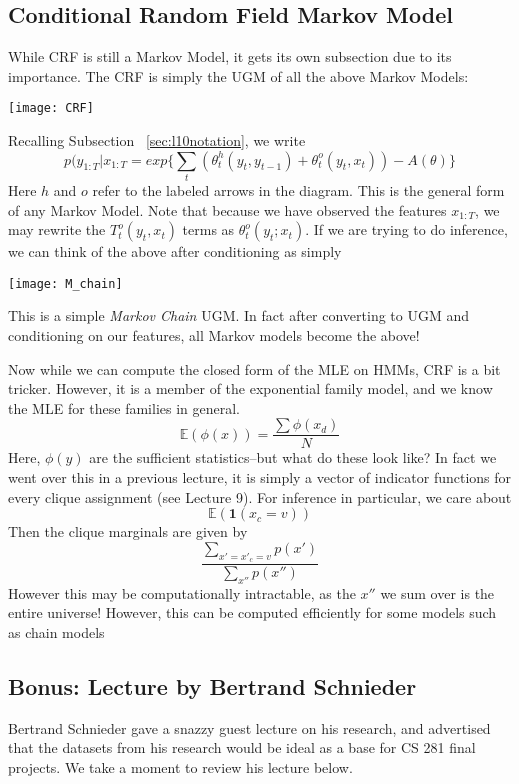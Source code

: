 \documentclass{article}
\begin{document}
\subsection{Conditional Random Field Markov Model}
While CRF is still a Markov Model, it gets its own subsection due to its importance. The CRF is simply the UGM of all the above Markov Models:
\begin{center}
\texttt{[image: CRF]} 
\end{center}
Recalling Subsection ~\ref{sec:l10notation}, we write
\[
p(y_{1:T}|x_{1:T} = exp\{\sum\limits_{t}(\theta_t^h(y_t,y_{t-1})+\theta_t^o(y_t,x_t)) - A(\theta) \}
\]
Here $h$ and $o$ refer to the labeled arrows in the diagram.
This is the general form of any Markov Model. Note that because we have observed the features $x_{1:T}$, we may rewrite the $T_t^o(y_t,x_t)$ terms as $\theta_t^o(y_t;x_t)$. If we are trying to do inference, we can think of the above after conditioning as simply
\begin{center}
\texttt{[image: M\_chain]} 
\end{center}
This is a simple \textit{Markov Chain} UGM. In fact after converting to UGM and conditioning on our features, all Markov models become the above! 

Now while we can compute the closed form of the MLE on HMMs, CRF is a bit tricker. However, it is a member of the exponential family model, and we know the MLE for these families in general.
\[
\mathbb{E}(\phi(x)) = \frac{\sum \phi(x_d)}{N}
\]
Here, $\phi(y)$ are the sufficient statistics--but what do these look like? In fact we went over this in a previous lecture, it is simply a vector of indicator functions for every clique assignment (see Lecture 9). For inference in particular, we care about
\[
\mathbb{E}(\textbf{1}(x_c=v))
\]
Then the clique marginals are given by
\[
\frac{\sum\limits_{x'=x'_c=v} p(x')}{\sum\limits_{x''}p(x'')}
\]
However this may be computationally intractable, as the $x''$ we sum over is the entire universe! However, this can be computed efficiently for some models such as chain models

\subsection{Bonus: Lecture by Bertrand Schnieder}

Bertrand Schnieder gave a snazzy guest lecture on his research, and advertised that the datasets from his research would be ideal as a base for CS 281 final projects.  We take a moment to review his lecture below.
\end{document}

